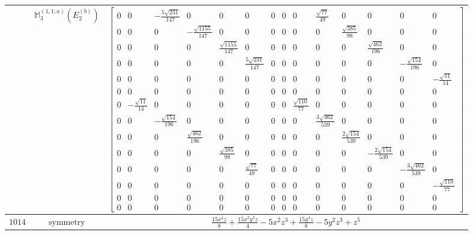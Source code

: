 \documentclass[fleqn,8pt,landscape]{jsarticle}
\begin{document}
\begin{longtable}{ccc}
$  $ & $ \mathbb{M}_{3}^{(1,1;a)}(E_{2}^{(b)}) $ & $ \begin{bmatrix} 0 & 0 & - \frac{5 \sqrt{231}}{147} & 0 & 0 & 0 & 0 & 0 & 0 & \frac{\sqrt{77}}{49} & 0 & 0 & 0 & 0 \\ 0 & 0 & 0 & - \frac{\sqrt{1155}}{147} & 0 & 0 & 0 & 0 & 0 & 0 & \frac{\sqrt{385}}{98} & 0 & 0 & 0 \\ 0 & 0 & 0 & 0 & \frac{\sqrt{1155}}{147} & 0 & 0 & 0 & 0 & 0 & 0 & \frac{\sqrt{462}}{196} & 0 & 0 \\ 0 & 0 & 0 & 0 & 0 & \frac{5 \sqrt{231}}{147} & 0 & 0 & 0 & 0 & 0 & 0 & - \frac{\sqrt{154}}{196} & 0 \\ 0 & 0 & 0 & 0 & 0 & 0 & 0 & 0 & 0 & 0 & 0 & 0 & 0 & - \frac{\sqrt{11}}{14} \\ 0 & 0 & 0 & 0 & 0 & 0 & 0 & 0 & 0 & 0 & 0 & 0 & 0 & 0 \\ 0 & - \frac{\sqrt{11}}{14} & 0 & 0 & 0 & 0 & 0 & 0 & \frac{\sqrt{110}}{77} & 0 & 0 & 0 & 0 & 0 \\ 0 & 0 & - \frac{\sqrt{154}}{196} & 0 & 0 & 0 & 0 & 0 & 0 & \frac{3 \sqrt{462}}{539} & 0 & 0 & 0 & 0 \\ 0 & 0 & 0 & \frac{\sqrt{462}}{196} & 0 & 0 & 0 & 0 & 0 & 0 & \frac{2 \sqrt{154}}{539} & 0 & 0 & 0 \\ 0 & 0 & 0 & 0 & \frac{\sqrt{385}}{98} & 0 & 0 & 0 & 0 & 0 & 0 & - \frac{2 \sqrt{154}}{539} & 0 & 0 \\ 0 & 0 & 0 & 0 & 0 & \frac{\sqrt{77}}{49} & 0 & 0 & 0 & 0 & 0 & 0 & - \frac{3 \sqrt{462}}{539} & 0 \\ 0 & 0 & 0 & 0 & 0 & 0 & 0 & 0 & 0 & 0 & 0 & 0 & 0 & - \frac{\sqrt{110}}{77} \\ 0 & 0 & 0 & 0 & 0 & 0 & 0 & 0 & 0 & 0 & 0 & 0 & 0 & 0 \\ 0 & 0 & 0 & 0 & 0 & 0 & 0 & 0 & 0 & 0 & 0 & 0 & 0 & 0 \end{bmatrix} $ \\ \hline
$ 1014 $ & $ \text{symmetry} $ & $ \frac{15 x^{4} z}{8} + \frac{15 x^{2} y^{2} z}{4} - 5 x^{2} z^{3} + \frac{15 y^{4} z}{8} - 5 y^{2} z^{3} + z^{5} $ \\

\end{longtable}
\end{document}
